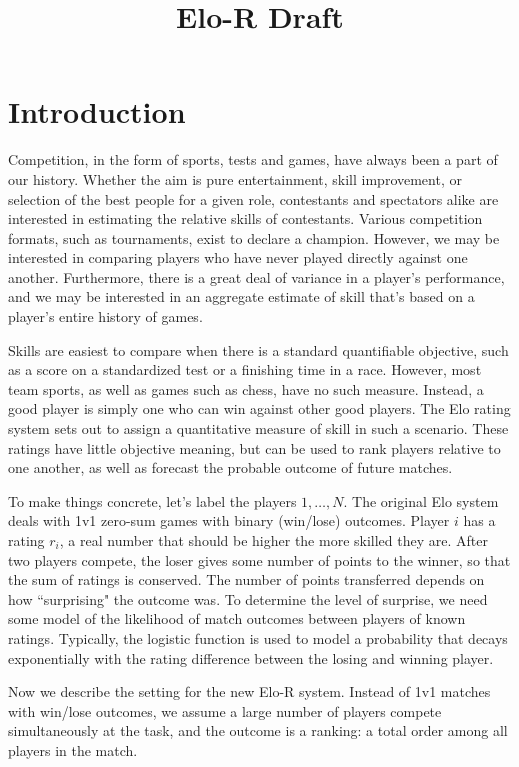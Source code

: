 \documentclass{article}
\title{Elo-R Draft}
\begin{document}
\maketitle

\section{Introduction}

Competition, in the form of sports, tests and games, have always been a part of our history. Whether the aim is pure entertainment, skill improvement, or selection of the best people for a given role, contestants and spectators alike are interested in estimating the relative skills of contestants. Various competition formats, such as tournaments, exist to declare a champion. However, we may be interested in comparing players who have never played directly against one another. Furthermore, there is a great deal of variance in a player's performance, and we may be interested in an aggregate estimate of skill that's based on a player's entire history of games.

Skills are easiest to compare when there is a standard quantifiable objective, such as a score on a standardized test or a finishing time in a race.  However, most team sports, as well as games such as chess, have no such measure. Instead, a good player is simply one who can win against other good players. The Elo rating system sets out to assign a quantitative measure of skill in such a scenario. These ratings have little objective meaning, but can be used to rank players relative to one another, as well as forecast the probable outcome of future matches.

To make things concrete, let's label the players $1,\ldots,N$. The original Elo system deals with 1v1 zero-sum games with binary (win/lose) outcomes. Player $i$ has a rating $r_i$, a real number that should be higher the more skilled they are. After two players compete, the loser gives some number of points to the winner, so that the sum of ratings is conserved. The number of points transferred depends on how ``surprising" the outcome was. To determine the level of surprise, we need some model of the likelihood of match outcomes between players of known ratings. Typically, the logistic function is used to model a probability that decays exponentially with the rating difference between the losing and winning player.

Now we describe the setting for the new Elo-R system. Instead of 1v1 matches with win/lose outcomes, we assume a large number of players compete simultaneously at the task, and the outcome is a ranking: a total order among all players in the match.
\end{document}
